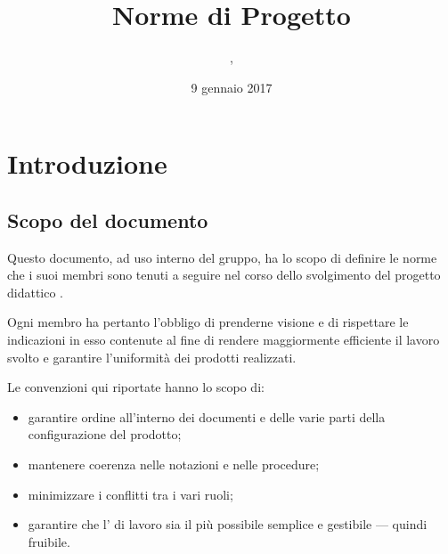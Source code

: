 


\author{\GG, \MM}
\supervisor{\LB, \AZ}
\dest{\ALL}
\title{Norme di Progetto}
\date{9 gennaio 2017}


\maketitle

\tableofcontents
\newpage




\section{Introduzione}

\subsection{Scopo del documento}
Questo documento, ad uso interno del gruppo, ha lo scopo di definire le norme che i suoi membri sono tenuti a seguire nel corso dello svolgimento del progetto didattico \proj.

Ogni membro ha pertanto l'obbligo di prenderne visione e di rispettare le indicazioni in esso contenute al fine di rendere maggiormente efficiente il lavoro svolto e garantire l'uniformità dei prodotti realizzati.

Le convenzioni qui riportate hanno lo scopo di:
\begin{itemize}
	\item garantire ordine all'interno dei documenti e delle varie parti della configurazione del prodotto;
	\item mantenere coerenza nelle notazioni e nelle procedure;
	\item minimizzare i conflitti tra i vari ruoli;
	\item garantire che l' di lavoro sia il più possibile semplice e gestibile --- quindi fruibile.
\end{itemize}

